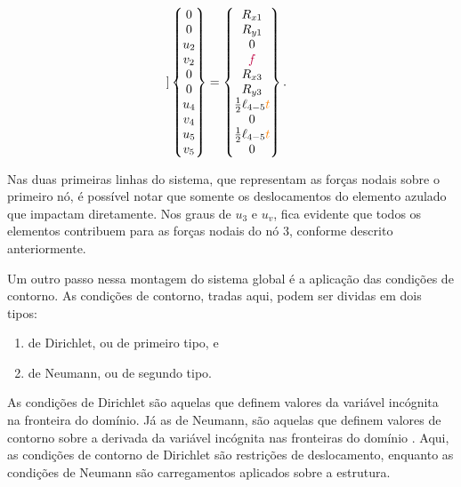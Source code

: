 \begin{landscape}
\begin{equation}
\begin{bmatrix}
            \end{bmatrix}
            \begin{Bmatrix}
                0 \\ 0 \\ u_2 \\ v_2 \\ 0 \\ 0 \\ u_4 \\ v_4 \\ u_5 \\ v_5
            \end{Bmatrix} = 
            \begin{Bmatrix}
                R_{x1} \\ R_{y1} \\ 0 \\ \textcolor{purple}{f} \\ R_{x3} \\ R_{y3} \\ \frac{1}{2} \ell_{4-5} \textcolor{orange}{t} \\ 0 \\ \frac{1}{2} \ell_{4-5} \textcolor{orange}{t} \\ 0
            \end{Bmatrix}.
        \label{eq:sistema_global_montado}
    \end{equation}
\end{landscape}
Nas duas primeiras linhas do sistema, que representam as forças nodais sobre o primeiro nó, é possível notar que somente os deslocamentos do elemento azulado que impactam diretamente. Nos graus de $u_3$ e $u_v$, fica evidente que todos os elementos contribuem para as forças nodais do nó $3$, conforme descrito anteriormente.

Um outro passo nessa montagem do sistema global é a aplicação das condições de contorno. As condições de contorno, tradas aqui, podem ser dividas em dois tipos: 

\begin{enumerate}
    \item de Dirichlet, ou de primeiro tipo, e
    \item de Neumann, ou de segundo tipo.
\end{enumerate}

 As condições de Dirichlet são aquelas que definem valores da variável incógnita na fronteira do domínio. Já as de Neumann, são aquelas que definem valores de contorno sobre a derivada da variável incógnita nas fronteiras do domínio \cite{sinan}. Aqui, as condições de contorno de Dirichlet são restrições de deslocamento, enquanto as condições de Neumann são carregamentos aplicados sobre a estrutura.
 
